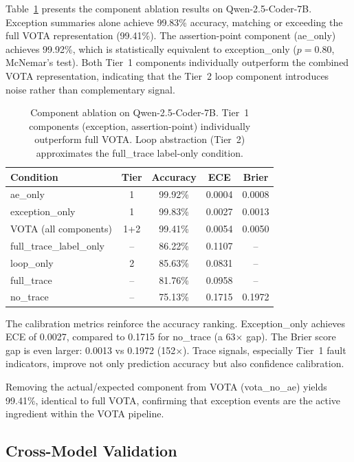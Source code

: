 \documentclass[11pt]{article}
\begin{document}
Table~\ref{tab:component} presents the component ablation results on Qwen-2.5-Coder-7B. Exception summaries alone achieve 99.83\% accuracy, matching or exceeding the full VOTA representation (99.41\%). The assertion-point component (ae\_only) achieves 99.92\%, which is statistically equivalent to exception\_only ($p=0.80$, McNemar's test). Both Tier~1 components individually outperform the combined VOTA representation, indicating that the Tier~2 loop component introduces noise rather than complementary signal.

\begin{table}[t]
\centering
\caption{Component ablation on Qwen-2.5-Coder-7B. Tier~1 components (exception, assertion-point) individually outperform full VOTA. Loop abstraction (Tier~2) approximates the full\_trace label-only condition.}
\label{tab:component}
\begin{tabular}{lcccc}
\toprule
Condition & Tier & Accuracy & ECE & Brier \\
\midrule
ae\_only & 1 & 99.92\% & 0.0004 & 0.0008 \\
exception\_only & 1 & 99.83\% & 0.0027 & 0.0013 \\
VOTA (all components) & 1+2 & 99.41\% & 0.0054 & 0.0050 \\
full\_trace\_label\_only & -- & 86.22\% & 0.1107 & -- \\
loop\_only & 2 & 85.63\% & 0.0831 & -- \\
full\_trace & -- & 81.76\% & 0.0958 & -- \\
no\_trace & -- & 75.13\% & 0.1715 & 0.1972 \\
\bottomrule
\end{tabular}
\end{table}

The calibration metrics reinforce the accuracy ranking. Exception\_only achieves ECE of 0.0027, compared to 0.1715 for no\_trace (a 63$\times$ gap). The Brier score gap is even larger: 0.0013 vs 0.1972 (152$\times$). Trace signals, especially Tier~1 fault indicators, improve not only prediction accuracy but also confidence calibration.

Removing the actual/expected component from VOTA (vota\_no\_ae) yields 99.41\%, identical to full VOTA, confirming that exception events are the active ingredient within the VOTA pipeline.

\subsection{Cross-Model Validation}
\label{sec:crossmodel}
\end{document}
